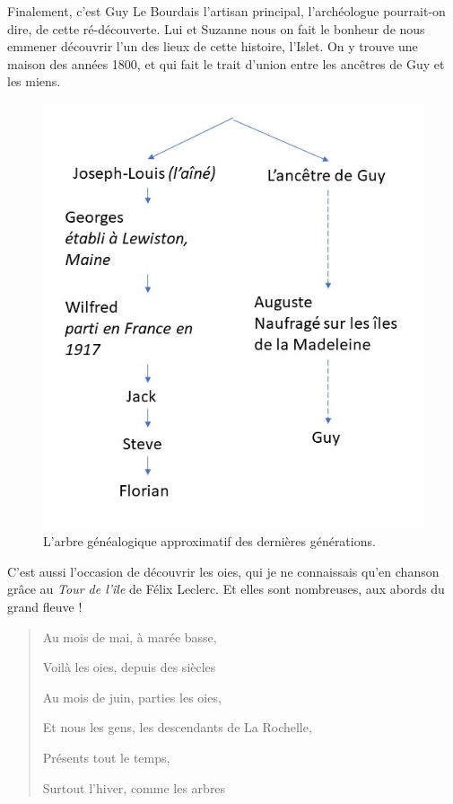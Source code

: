 Finalement, c'est Guy Le Bourdais l'artisan principal, l'archéologue
pourrait-on dire, de cette ré-découverte. Lui et Suzanne nous on fait le
bonheur de nous emmener découvrir l'un des lieux de cette histoire,
l'Islet. On y trouve une maison des années 1800, et qui fait le trait
d'union entre les ancêtres de Guy et les miens.

\begin{figure}
\centering
\includegraphics{images/20181022_arbre_genealogique.jpg}
\caption{L'arbre généalogique approximatif des dernières générations.}
\end{figure}

C'est aussi l'occasion de découvrir les oies, qui je ne connaissais
qu'en chanson grâce au \emph{Tour de l'île} de Félix Leclerc. Et elles
sont nombreuses, aux abords du grand fleuve !

\begin{quote}
Au mois de mai, à marée basse,

Voilà les oies, depuis des siècles

Au mois de juin, parties les oies,

Et nous les gens, les descendants de La Rochelle,

Présents tout le temps,

Surtout l'hiver, comme les arbres
\end{quote}


